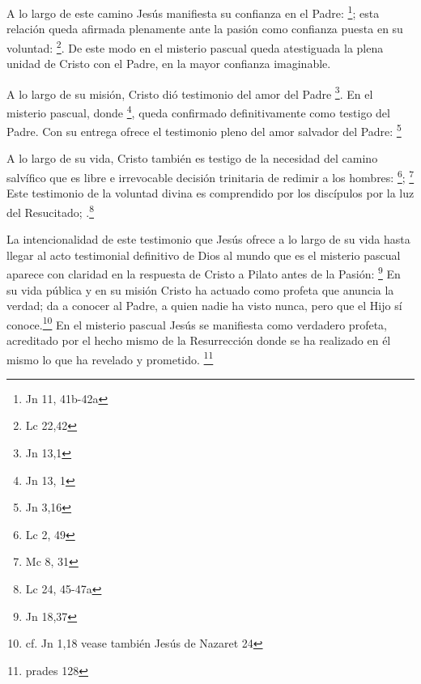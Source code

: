A lo largo de este camino Jesús manifiesta su confianza en el Padre:
\footnote{Jn 11, 41b-42a}; esta relación queda afirmada
plenamente ante la pasión como confianza puesta en su voluntad:
\footnote{Lc 22,42}. De este modo en el misterio pascual queda
atestiguada la plena unidad de Cristo con el Padre, en la mayor confianza
imaginable.\autocite[127]{prades2015testimonio}

A lo largo de su misión, Cristo dió testimonio del amor del Padre
\footnote{Jn 13,1}. En el misterio pascual, donde
\footnote{Jn 13, 1}, queda confirmado
definitivamente como testigo del Padre. Con su entrega ofrece el testimonio
pleno del amor salvador del Padre: \footnote{Jn 3,16}

A lo largo de su vida, Cristo también es testigo de la necesidad del camino
salvífico que es libre e irrevocable decisión trinitaria de redimir a los
hombres\autocite[128]{prades2015testimonio}: \footnote{Lc 2, 49}; \footnote{Mc
  8, 31} Este testimonio de la voluntad divina es comprendido por los discípulos
por la luz del Resucitado; .\footnote{Lc 24, 45-47a}

La intencionalidad de este testimonio que Jesús ofrece a lo largo de su vida
hasta llegar al acto testimonial definitivo de Dios al mundo que es el misterio
pascual aparece con claridad en la respuesta de Cristo a Pilato antes de la
Pasión: \footnote{Jn 18,37} En su vida pública y en su misión Cristo ha actuado
como profeta que anuncia la verdad; da a conocer al Padre, a quien nadie ha
visto nunca, pero que el Hijo sí conoce.\footnote{cf. Jn 1,18 vease también
  Jesús de Nazaret 24} En el misterio pascual Jesús se manifiesta como verdadero
profeta, acreditado por el hecho mismo de la Resurrección donde se ha realizado
en él mismo lo que ha revelado y prometido. \footnote{prades 128}

